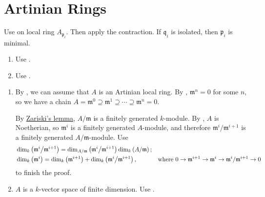 \section{Artinian Rings}

\begin{exercise}\label{ex8.1}
	Use  on local ring $A_{\mathfrak{p}_i}$. Then apply the contraction. If $\mathfrak{q}_i$ is isolated, then $\mathfrak{p}_i$ is minimal.
\end{exercise}

\begin{exercise}\label{ex8.2}
	\begin{enumerate}
		\item[(i) $\Rightarrow$ (ii)] Use .
		\item[(iii) $\Rightarrow$ (i)] Use .
	\end{enumerate}
\end{exercise}

\begin{exercise}\label{ex8.3}
	\begin{enumerate}
		\item[(i) $\Rightarrow$ (ii)] By , we can assume that $A$ is an Artinian local ring. By , $\mathfrak{m}^n=0$ for some $n$, so we have a chain $A=\mathfrak{m}^0\supseteq\mathfrak{m}^1\supseteq\cdots\supseteq\mathfrak{m}^n=0$.\par
		By \hyperref[7.9]{Zariski's lemma}, $A/\mathfrak{m}$ is a finitely generated $k$-module. By , $A$ is Noetherian, so $\mathfrak{m}^i$ is a finitely generated $A$-module,  and therefore $\mathfrak{m}^i/\mathfrak{m}^{i+1}$ is a finitely generated $A/\mathfrak{m}$-module. Use
		\begin{align*}
			&\dim_k\left(\mathfrak{m}^i\middle/\mathfrak{m}^{i+1}\right)=\dim_{A/\mathfrak{m}}\left(\mathfrak{m}^i\middle/\mathfrak{m}^{i+1}\right)\dim_k\left(A\middle/\mathfrak{m}\right);&&\\
			&\dim_k\left(\mathfrak{m}^i\right)=\dim_k\left(\mathfrak{m}^{i+1}\right)+\dim_k\left(\mathfrak{m}^i\middle/\mathfrak{m}^{i+1}\right),&&\text{where }0\rightarrow\mathfrak{m}^{i+1}\rightarrow\mathfrak{m}^i\rightarrow\mathfrak{m}^i/\mathfrak{m}^{i+1}\rightarrow0
		\end{align*}
		to finish the proof.
		\item[(ii) $\Rightarrow$ (i)] $A$ is a $k$-vector space of finite dimension. Use .
	\end{enumerate}
\end{exercise}

